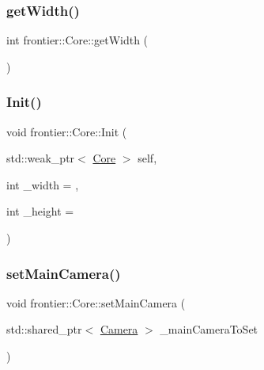\mbox{\label{classfrontier_1_1_core_a33e04425e25f249efb46e116eedca8dc}} 
\subsubsection{\texorpdfstring{get\+Width()}{getWidth()}}
{\footnotesize\ttfamily int frontier\+::\+Core\+::get\+Width (\begin{DoxyParamCaption}{ }\end{DoxyParamCaption})}

\mbox{\label{classfrontier_1_1_core_a0f2b7feb2638d3bf3f67919f5596ab6c}} 
\subsubsection{\texorpdfstring{Init()}{Init()}}
{\footnotesize\ttfamily void frontier\+::\+Core\+::\+Init (\begin{DoxyParamCaption}\item[{std\+::weak\+\_\+ptr$<$ \hyperlink{classfrontier_1_1_core}{Core} $>$}]{self,  }\item[{int}]{\+\_\+width = {},  }\item[{int}]{\+\_\+height = {} }\end{DoxyParamCaption})}

\mbox{\label{classfrontier_1_1_core_ae141ff5c7d41cf7bc22c37bddb9087f9}} 
\subsubsection{\texorpdfstring{set\+Main\+Camera()}{setMainCamera()}}
{\footnotesize\ttfamily void frontier\+::\+Core\+::set\+Main\+Camera (\begin{DoxyParamCaption}\item[{std\+::shared\+\_\+ptr$<$ \hyperlink{classfrontier_1_1_camera}{Camera} $>$}]{\+\_\+main\+Camera\+To\+Set }\end{DoxyParamCaption})}

